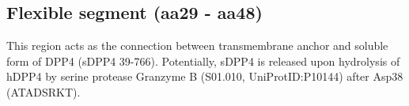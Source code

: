 \subsection{Flexible segment (aa29 - aa48)}

This region acts as the connection between transmembrane anchor and soluble form of DPP4 (sDPP4 39-766). Potentially, sDPP4 is released upon hydrolysis of hDPP4 by serine protease Granzyme B (S01.010, UniProtID:P10144) after Asp38 (ATADSRKT).~\cite{Song_2018} 
